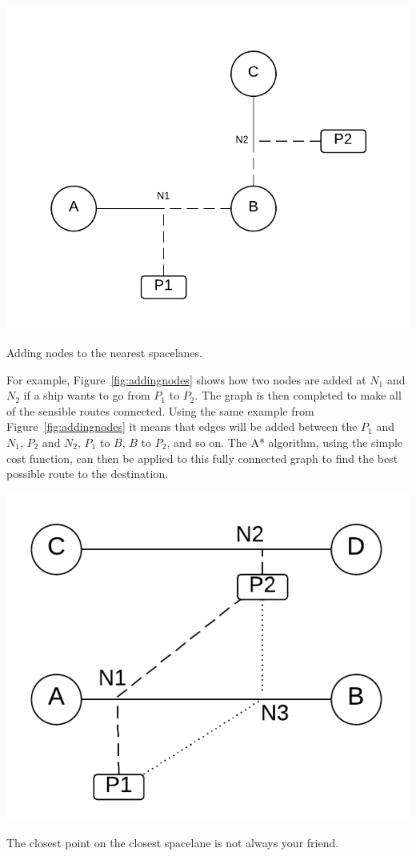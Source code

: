 \begin{marginfigure}
	\includegraphics{res/pathfinding/PathFindingSector3.pdf}
	\caption[Adding nodes to the nearest spacelanes]{Adding nodes to the nearest spacelanes.}
	\label{fig:addingnodes}
\end{marginfigure}

For example, Figure~\ref{fig:addingnodes} shows how two nodes are added at $N_1$ and $N_2$ if a ship wants to go from $P_1$ to $P_2$. The graph is then completed to make all of the sensible routes connected. Using the same example from Figure~\ref{fig:addingnodes} it means that edges will be added between the $P_1$ and $N_1$, $P_2$ and $N_2$, $P_1$ to $B$, $B$ to $P_2$, and so on. The A* algorithm, using the simple cost function, can then be applied to this fully connected graph to find the best possible route to the destination.

\begin{marginfigure}
	\includegraphics{res/pathfinding/NearestSpaceLaneUseless.pdf}
	\caption[The closest point on the closest spacelane is not always your friend]{The closest point on the closest spacelane is not always your friend.}
	\label{fig:uselessspacelane}
\end{marginfigure}

